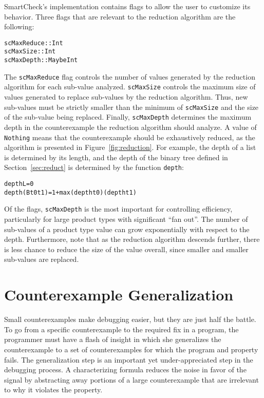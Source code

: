 \documentclass{sigplanconf}
\newenvironment{code}{\begin{alltt}\footnotesize}{\end{alltt}}
\newcommand{\ttp}[1]{\texttt{#1}}
\begin{document}
SmartCheck's implementation contains flags to allow the user to customize its
behavior.  Three flags that are relevant to the reduction algorithm are the
following:
%
\begin{code}
scMaxReduce :: Int
scMaxSize   :: Int
scMaxDepth  :: Maybe Int
\end{code}
%
\noindent
The \ttp{scMaxReduce} flag controls the number of values generated by the
reduction algorithm for each sub-value analyzed.  \ttp{scMaxSize} controls the
maximum size of values generated to replace sub-values by the reduction
algorithm.  Thus, new sub-values must be strictly smaller than the minimum of
\ttp{scMaxSize} and the size of the sub-value being replaced.  Finally,
\ttp{scMaxDepth} determines the maximum depth in the counterexample the
reduction algorithm should analyze.  A value of \ttp{Nothing} means that the
counterexample should be exhaustively reduced, as the algorithm is presented in
Figure~\ref{fig:reduction}.  For example, the depth of a list is determined by
its length, and the depth of the binary tree defined in Section~\ref{sec:reduct}
is determined by the function \ttp{depth}:
%
\begin{code}
depth L         = 0
depth (B t0 t1) = 1 + max (depth t0) (depth t1)
\end{code}
%
\noindent
Of the flags, \ttp{scMaxDepth} is the most important for controlling
efficiency, particularly for large product types with significant ``fan out''.
The number of sub-values of a product type value can grow exponentially with
respect to the depth.  Furthermore, note that as the reduction algorithm
descends further, there is less chance to reduce the size of the value overall,
since smaller and smaller sub-values are replaced.


\section{Counterexample Generalization}\label{sec:generalization}

Small counterexamples make debugging easier, but they are just half the battle.
To go from a specific counterexample to the required fix in a program, the
programmer must have a flash of insight in which she generalizes the
counterexample to a set of counterexamples for which the program and property
fails.  The generalization step is an important yet under-appreciated step in
the debugging process.  A characterizing formula reduces the noise in favor of
the signal by abstracting away portions of a large counterexample that are
irrelevant to why it violates the property.
\end{document}
